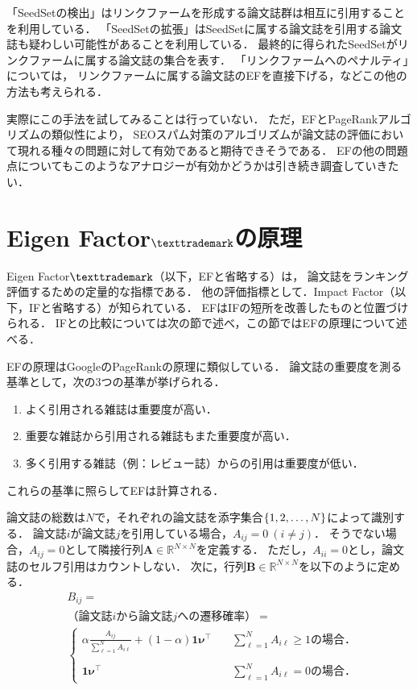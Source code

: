 「SeedSetの検出」はリンクファームを形成する論文誌群は相互に引用することを利用している．
「SeedSetの拡張」はSeedSetに属する論文誌を引用する論文誌も疑わしい可能性があることを利用している．
最終的に得られたSeedSetがリンクファームに属する論文誌の集合を表す．
「リンクファームへのペナルティ」については，
リンクファームに属する論文誌のEFを直接下げる，などこの他の方法も考えられる．
\par
実際にこの手法を試してみることは行っていない．
ただ，EFとPageRankアルゴリズムの類似性により，
SEOスパム対策のアルゴリズムが論文誌の評価において現れる種々の問題に対して有効であると期待できそうである．
EFの他の問題点についてもこのようなアナロジーが有効かどうかは引き続き調査していきたい．


\section{Eigen Factor$\texttrademark$の原理}
Eigen Factor$\texttrademark$（以下，EFと省略する）は，
論文誌をランキング評価するための定量的な指標である．
他の評価指標として．Impact Factor（以下，IFと省略する）が知られている．
EFはIFの短所を改善したものと位置づけられる．
IFとの比較については次の節で述べ，この節ではEFの原理について述べる．
\par
EFの原理はGoogleのPageRankの原理に類似している．
論文誌の重要度を測る基準として，次の3つの基準が挙げられる．
\begin{enumerate}
    \item よく引用される雑誌は重要度が高い．
    \item 重要な雑誌から引用される雑誌もまた重要度が高い．
    \item 多く引用する雑誌（例：レビュー誌）からの引用は重要度が低い．
\end{enumerate}
これらの基準に照らしてEFは計算される．
\par
論文誌の総数は$N$で，それぞれの論文誌を添字集合$\lbrace 1,2,\ldots,N \rbrace$によって識別する．
論文誌$i$が論文誌$j$を引用している場合，$A_{ij}=0~(i\neq j)$．
そうでない場合，$A_{ij}=0$として隣接行列$\bm{A} \in \mathbb{R}^{N \times N}$を定義する．
ただし，$A_{ii}=0$とし，論文誌のセルフ引用はカウントしない．
次に，行列$\bm{B} \in \mathbb{R}^{N \times N}$を以下のように定める．
\begin{align}
    & B_{ij} = \\
    & \text{（論文誌$i$から論文誌$j$への遷移確率）} = \\
    & \begin{cases}
        \alpha \frac{A_{ij}}{\sum_{\ell=1}^N A_{i\ell}} + (1-\alpha) \bm{1}\bm{\nu}^{\top}
        &\quad \sum_{\ell=1}^N A_{i\ell} \geq 1\text{の場合．} \\
        \\
        \bm{1}\bm{\nu}^{\top}
        &\quad \sum_{\ell=1}^N A_{i\ell} =0\text{の場合．} 
    \end{cases}
\end{align}
